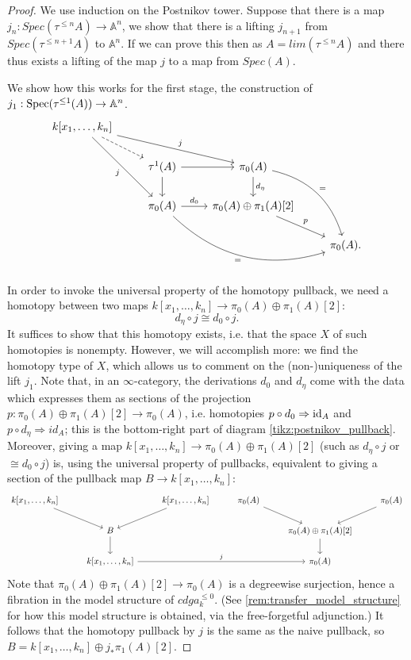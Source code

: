 \documentclass[10pt,a4paper,reqno,oneside]{book} %
\theoremstyle{plain}
\theoremstyle{definition}
\theoremstyle{remark}
\numberwithin{equation}{section}
\begin{document}
\begin{proof}
We use induction on the Postnikov tower. Suppose that there is a map $j_{n}: Spec(\tau^{\leq n}A)\rightarrow 
\mathbb{A}^{n}$, we show that there is a lifting $j_{n+1}$ from $Spec(\tau^{\leq n+1}A)$ to $\mathbb{A}^{n}$.  
If we can prove this then as $A=lim(\tau^{\leq n}A)$ and there thus exists a lifting of the map $j$ to a map 
from $Spec(A)$. 

We show how this works for the first stage, the construction of $j_1 : \operatorname{Spec}(\tau^{\leq 1}(A)) \to \mathbb A^n$.
\[
\begin{tikzcd}
\label{tikz:postnikov_pullback}
k[x_1, \dots, k_n]\arrow{drr}{j}\arrow[swap]{ddr}{j}\arrow[dashed]{dr} & & & \\
 & \tau^{1}(A)\arrow{r}\arrow{d} & \pi_0(A)\arrow{d}{d_{\eta}}\arrow[bend left]{ddr}{=} & \\
 & \pi_0(A)\arrow[swap, bend right]{drr}{=} \arrow{r}{d_0} & \pi_0(A) \oplus \pi_1(A)[2]\arrow{dr}{p} & \\
 & & & \pi_0(A) .
\end{tikzcd}
\]

In order to invoke the universal property of the homotopy pullback, we need a homotopy between two maps
$k[x_1, \dots, k_n] \to \pi_0(A) \oplus \pi_1(A)[2]$:
\[	d_{\eta} \circ j \cong d_{0} \circ j.	\]
It suffices to show that this homotopy exists, i.e. that the space $X$ of such homotopies is nonempty. However,
we will accomplish more: we find the homotopy type of $X$, which allows us to comment on the (non-)uniqueness
of the lift $j_1$. Note that, in an $\infty$-category, the derivations $d_0$ and $d_{\eta}$ come with the data which expresses
them as sections of the projection $p:\pi_0(A) \oplus \pi_1(A)[2] \to \pi_0(A)$, i.e. homotopies $p\circ d_0
\Rightarrow \mathrm{id}_A$ and $p\circ d_{\eta} \Rightarrow id_A$; this is the bottom-right part of diagram \ref{tikz:postnikov_pullback}.
Moreover, giving a map $k[x_1, \dots, k_n] \to \pi_0(A) \oplus \pi_1(A)[2]$ (such as $d_{\eta} \circ j$ or $\cong d_{0} \circ j$)
is, using the universal property of pullbacks, equivalent to giving a section of the pullback map $B \to k[x_1, \dots, k_n]$:
\[
\begin{tikzcd}
k[x_1, \dots, k_n]\arrow{dr} & & k[x_1, \dots, k_n]\arrow{dl} & \pi_0(A)\arrow{dr} & & \pi_0(A)\arrow{dl} \\
& B\arrow{d} & & & \pi_0(A) \oplus \pi_1(A)[2]\arrow{d} & \\
& k[x_1, \dots, k_n] \arrow{rrr}{j} & & & \pi_0(A) & 
\end{tikzcd}
\]
Note that $\pi_0(A) \oplus \pi_1(A)[2] \to \pi_0(A)$ is a degreewise surjection, hence a fibration in the model structure
of $cdga_k^{\leq 0}$. (See \ref{rem:transfer_model_structure} for how this model structure is obtained, via the free-forgetful
adjunction.) It follows that the homotopy pullback by $j$ is the same as the naive pullback, so $B = k[x_1, \dots, k_n]
\oplus j_*\pi_1(A)[2]$.


\end{proof}
\end{document}
